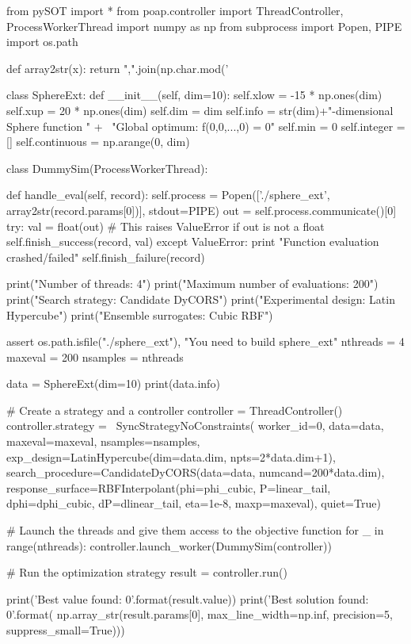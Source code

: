 \documentclass[]{article}
\begin{document}
\begin{python}
from pySOT import *
from poap.controller import ThreadController, ProcessWorkerThread
import numpy as np
from subprocess import Popen, PIPE
import os.path

def array2str(x):
    return ",".join(np.char.mod('%


class SphereExt:
    def __init__(self, dim=10):
        self.xlow = -15 * np.ones(dim)
        self.xup = 20 * np.ones(dim)
        self.dim = dim
        self.info = str(dim)+"-dimensional Sphere function \n" + \
                    "Global optimum: f(0,0,...,0) = 0"
        self.min = 0
        self.integer = []
        self.continuous = np.arange(0, dim)


class DummySim(ProcessWorkerThread):

    def handle_eval(self, record):
        self.process = Popen(['./sphere_ext', array2str(record.params[0])],
                             stdout=PIPE)
        out = self.process.communicate()[0]
        try:
            val = float(out)  # This raises ValueError if out is not a float
            self.finish_success(record, val)
        except ValueError:
            print "Function evaluation crashed/failed"
            self.finish_failure(record)

print("Number of threads: 4")
print("Maximum number of evaluations: 200")
print("Search strategy: Candidate DyCORS")
print("Experimental design: Latin Hypercube")
print("Ensemble surrogates: Cubic RBF")

assert os.path.isfile("./sphere_ext"), "You need to build sphere_ext"
nthreads = 4
maxeval = 200
nsamples = nthreads

data = SphereExt(dim=10)
print(data.info)

# Create a strategy and a controller
controller = ThreadController()
controller.strategy = \
    SyncStrategyNoConstraints(
        worker_id=0, data=data,
        maxeval=maxeval, nsamples=nsamples,
        exp_design=LatinHypercube(dim=data.dim, npts=2*data.dim+1),
        search_procedure=CandidateDyCORS(data=data, numcand=200*data.dim),
        response_surface=RBFInterpolant(phi=phi_cubic, P=linear_tail,
                                        dphi=dphi_cubic, dP=dlinear_tail,
                                        eta=1e-8, maxp=maxeval),
        quiet=True)

# Launch the threads and give them access to the objective function
for _ in range(nthreads):
    controller.launch_worker(DummySim(controller))

# Run the optimization strategy
result = controller.run()

print('Best value found: {0}'.format(result.value))
print('Best solution found: {0}'.format(
    np.array_str(result.params[0], max_line_width=np.inf,
                 precision=5, suppress_small=True)))
\end{python}
\end{document}
